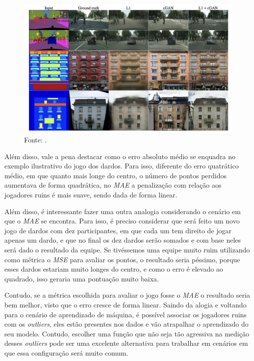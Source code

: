 \begin{figure}[h]
    \centering
    \includegraphics[width=0.65\linewidth]{../imagens/perda-regressao/image-to-image-perdas-comparativo.png}
    
    \caption[Perdas diferentes induzem qualidades de resultados diferentes. Cada coluna mostra resultados treinados sob uma perda diferenteas de aprendizado no dataset MNIST]{%
        \newline
        \small Fonte: \parencite{ImageToImage}.
    }
    \label{fig:comparativo-perdas-image-to-image}
\end{figure}

Além disso, vale a pena destacar como o erro absoluto médio se enquadra no exemplo ilustrativo do jogo dos dardos. Para isso, diferente do erro quatrático médio, em que quanto mais longe do centro, o número de pontos perdidos aumentava de forma quadrática, no \textit{MAE} a penalização com relação aos jogadores ruins é mais suave, sendo dada de forma linear. 

Além disso, é interessante fazer uma outra analogia considerando o cenário em que o \textit{MAE} se encontra. Para isso, é preciso considerar que será feito um novo jogo de dardos com dez participantes, em que cada um tem direito de jogar apenas um dardo, e que no final os dez dardos serão somados e com base neles será dado o resultado da equipe. Se tivéssemos uma equipe muito ruim utilizando como métrica o \textit{MSE} para avaliar os pontos, o resultado seria péssimo, porque esses dardos estariam muito longes do centro, e como o erro é elevado ao quadrado, isso geraria uma pontuação muito baixa. 

Contudo, se a métrica escolhida para avaliar o jogo fosse o \textit{MAE} o resultado seria bem melhor, visto que o erro cresce de forma linear. Saindo da alogia e voltando para o cenário de aprendizado de máquina, é possível associar os jogadores ruins com os \textit{outliers}, eles estão presentes nos dados e vão atrapalhar o aprendizado do seu modelo. Contudo, escolher uma função que não seja tão agressiva na medição desses \textit{outliers} pode ser uma excelente alternativa para trabalhar em cenários em que essa configuração será muito comum.

